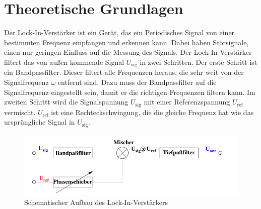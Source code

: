 \section{Theoretische Grundlagen}
Der Lock-In-Verstärker ist ein Gerät, das ein Periodisches Signal von einer bestimmten Frequenz empfangen und erkennen kann.
Dabei haben Störsignale, einen nur geringen Einfluss auf die Messung des Signals.
Der Lock-In-Verstärker filtert das von außen kommende Signal $U_\text{sig}$ in zwei Schritten.
Der erste Schritt ist ein Bandpassfilter.
Dieser filtert alle Frequenzen heraus, die sehr weit von der Signalfrequenz $\omega$ entfernt sind.
Dazu muss der Bandpassfilter auf die Signalfrequenz eingestellt sein, damit er die richtigen Frequenzen filtern kann.
Im zweiten Schritt wird die Signalspannung $U_\text{sig}$ mit einer Referenzspannung $U_\text{ref}$ vermischt.
$U_\text{ref}$ ist eine Rechteckschwingung, die die gleiche Frequenz hat wie das ursprüngliche Signal in $U_\text{sig}$.

\begin{figure}
    \includegraphics[width=\textwidth]{Abbildungen/Grundlegende_idee.png}
    \caption{Schematischer Aufbau des Lock-In-Verstärkers \cite[][]{man:v303}}
    \label{fig:grundlegende_Idee}
\end{figure}

